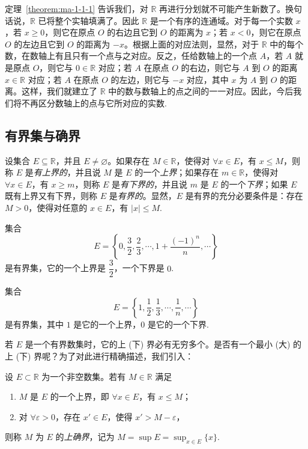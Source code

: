 定理~\ref{theorem:ma-1-1-1} 告诉我们，对 $\mathbb{R}$ 再进行分划就不可能产生新数了。换句话说，$\mathbb{R}$ 已将整个实轴填满了。因此 $\mathbb{R}$ 是一个有序的连通域。对于每一个实数 $x$，若 $x\geqslant0$，则它在原点 $O$ 的右边且它到 $O$ 的距离为 $x$；若 $x<0$，则它在原点 $O$ 的左边且它到 $O$ 的距离为 $-x$。根据上面的对应法则，显然，对于 $\mathbb{R}$ 中的每个数，在数轴上有且只有一个点与之对应。反之，任给数轴上的一个点 $A$，若 $A$ 就是原点 $O$，则它与 $0\in\mathbb{R}$ 对应；若 $A$ 在原点 $O$ 的右边，则它与 $A$ 到 $O$ 的距离 $x\in\mathbb{R}$ 对应；若 $A$ 在原点 $O$ 的左边，则它与 $-x$ 对应，其中 $x$ 为 $A$ 到 $O$ 的距离。这样，我们就建立了 $\mathbb{R}$ 中的数与数轴上的点之间的一一对应。因此，今后我们将不再区分数轴上的点与它所对应的实数.

\subsection{有界集与确界}
\label{subsec:ma-1-1-3}

设集合 $E\subseteq\mathbb{R}$，并且 $E\ne\varnothing$。如果存在 $M\in\mathbb{R}$，使得对 $\forall x\in E$，有 $x\leqslant M$，则称 $E$ 是\emph{有上界的}，并且说 $M$ 是 $E$ 的一个\emph{上界}；如果存在 $m\in\mathbb{R}$，使得对 $\forall x\in E$，有 $x\geqslant m$，则称 $E$ 是\emph{有下界的}，并且说 $m$ 是 $E$ 的一个\emph{下界}；如果 $E$ 既有上界又有下界，则称 $E$ 是\emph{有界的}。显然，$E$ 是有界的充分必要条件是：存在 $M>0$，使得对任意的 $x\in E$，有 $|x|\leqslant M$.

\begin{example}\label{example:ma-1-1-2}
集合
\[
  E=\left\{0,\frac32,\frac23,\cdots,1+\frac{(-1)^n}{n},\cdots\right\}
\]
是有界集，它的一个上界是 $\dfrac32$，一个下界是 $0$.
\end{example}


\begin{example}\label{example:ma-1-1-3}
集合
\[
  E=\left\{1,\frac12,\frac13,\cdots,\frac1n,\cdots\right\}
\]
是有界集，其中 $1$ 是它的一个上界，$0$ 是它的一个下界.
\end{example}

若 $E$ 是一个有界数集时，它的上 (下) 界必有无穷多个。是否有一个最小 (大) 的上 (下) 界呢？为了对此进行精确描述，我们引入：

\begin{definition}\label{definition:ma-1-1-2}
设 $E\subset\mathbb{R}$ 为一个非空数集。若有 $M\in\mathbb{R}$ 满足
\begin{enumerate}
  \item $M$ 是 $E$ 的一个上界，即 $\forall x\in E$，有 $x\leqslant M$；
  \item 对 $\forall\varepsilon>0$，存在 $x'\in E$，使得 $x'>M-\varepsilon$，
\end{enumerate}
则称 $M$ 为 $E$ 的\emph{上确界}，记为 $M=\sup E=\sup_{x\in E}\{x\}$.
\end{definition}

